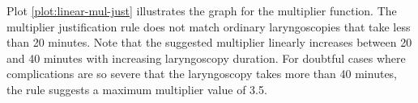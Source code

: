 Plot \ref{plot:linear-mul-just} illustrates the graph for the multiplier function.
The multiplier justification rule does not match ordinary laryngoscopies that take less than 20 minutes.
Note that the suggested multiplier linearly increases between 20 and 40 minutes with increasing laryngoscopy duration.
For doubtful cases where complications are so severe that the laryngoscopy takes more than 40 minutes, the rule suggests a maximum multiplier value of 3.5.
